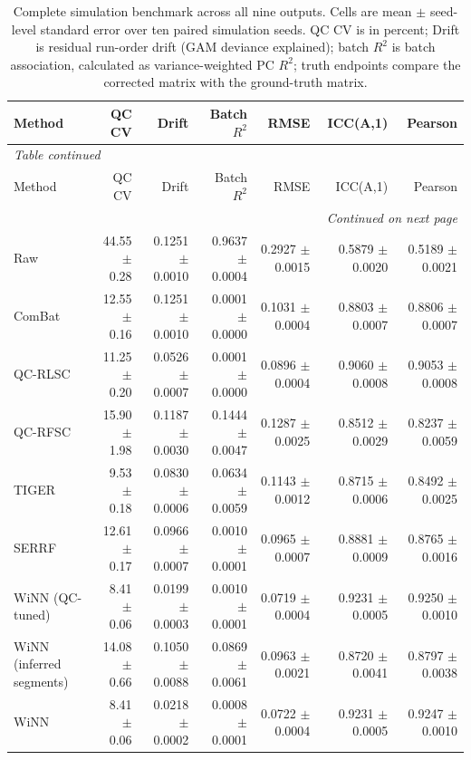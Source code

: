 \begin{landscape}
\scriptsize
\begin{longtable}{lrrrrrr}
\caption{Complete simulation benchmark across all nine outputs. Cells are mean $\pm$ seed-level standard error over ten paired simulation seeds. QC CV is in percent; Drift is residual run-order drift (GAM deviance explained); batch $R^2$ is batch association, calculated as variance-weighted PC $R^2$; truth endpoints compare the corrected matrix with the ground-truth matrix.}\label{tab:supp_simulation_all}\\
\toprule
Method & QC CV & Drift & Batch $R^2$ & RMSE & ICC(A,1) & Pearson \\
\midrule
\endfirsthead
\multicolumn{7}{l}{\textit{Table \thetable{} continued}}\\
\toprule
Method & QC CV & Drift & Batch $R^2$ & RMSE & ICC(A,1) & Pearson \\
\midrule
\endhead
\midrule
\multicolumn{7}{r}{\textit{Continued on next page}}\\
\endfoot
\bottomrule
\endlastfoot
Raw & 44.55 $\pm$ 0.28 & 0.1251 $\pm$ 0.0010 & 0.9637 $\pm$ 0.0004 & 0.2927 $\pm$ 0.0015 & 0.5879 $\pm$ 0.0020 & 0.5189 $\pm$ 0.0021 \\
ComBat & 12.55 $\pm$ 0.16 & 0.1251 $\pm$ 0.0010 & 0.0001 $\pm$ 0.0000 & 0.1031 $\pm$ 0.0004 & 0.8803 $\pm$ 0.0007 & 0.8806 $\pm$ 0.0007 \\
QC-RLSC & 11.25 $\pm$ 0.20 & 0.0526 $\pm$ 0.0007 & 0.0001 $\pm$ 0.0000 & 0.0896 $\pm$ 0.0004 & 0.9060 $\pm$ 0.0008 & 0.9053 $\pm$ 0.0008 \\
QC-RFSC & 15.90 $\pm$ 1.98 & 0.1187 $\pm$ 0.0030 & 0.1444 $\pm$ 0.0047 & 0.1287 $\pm$ 0.0025 & 0.8512 $\pm$ 0.0029 & 0.8237 $\pm$ 0.0059 \\
TIGER & 9.53 $\pm$ 0.18 & 0.0830 $\pm$ 0.0006 & 0.0634 $\pm$ 0.0059 & 0.1143 $\pm$ 0.0012 & 0.8715 $\pm$ 0.0006 & 0.8492 $\pm$ 0.0025 \\
SERRF & 12.61 $\pm$ 0.17 & 0.0966 $\pm$ 0.0007 & 0.0010 $\pm$ 0.0001 & 0.0965 $\pm$ 0.0007 & 0.8881 $\pm$ 0.0009 & 0.8765 $\pm$ 0.0016 \\
WiNN (QC-tuned) & 8.41 $\pm$ 0.06 & 0.0199 $\pm$ 0.0003 & 0.0010 $\pm$ 0.0001 & 0.0719 $\pm$ 0.0004 & 0.9231 $\pm$ 0.0005 & 0.9250 $\pm$ 0.0010 \\
WiNN (inferred segments) & 14.08 $\pm$ 0.66 & 0.1050 $\pm$ 0.0088 & 0.0869 $\pm$ 0.0061 & 0.0963 $\pm$ 0.0021 & 0.8720 $\pm$ 0.0041 & 0.8797 $\pm$ 0.0038 \\
WiNN & 8.41 $\pm$ 0.06 & 0.0218 $\pm$ 0.0002 & 0.0008 $\pm$ 0.0001 & 0.0722 $\pm$ 0.0004 & 0.9231 $\pm$ 0.0005 & 0.9247 $\pm$ 0.0010 \\
\end{longtable}
\end{landscape}
